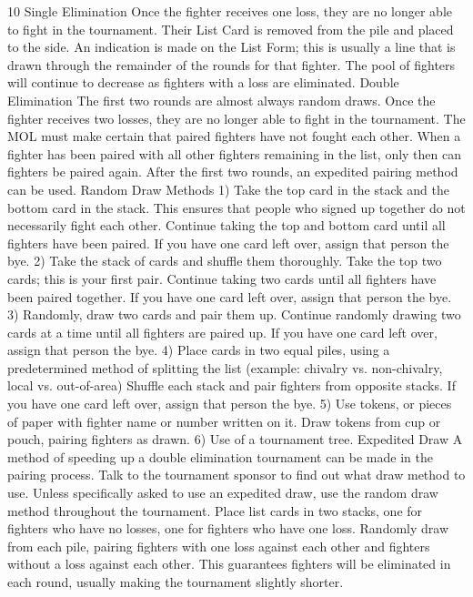 \documentclass{article}
\begin{document}
10
Single Elimination
Once the fighter receives one loss, they are no longer able to fight in the tournament. Their List Card is
removed from the pile and placed to the side. An indication is made on the List Form; this is usually a line
that is drawn through the remainder of the rounds for that fighter. The pool of fighters will continue to
decrease as fighters with a loss are eliminated.
Double Elimination
The first two rounds are almost always random draws. Once the fighter receives two losses, they are no
longer able to fight in the tournament. The MOL must make certain that paired fighters have not fought
each other. When a fighter has been paired with all other fighters remaining in the list, only then can
fighters be paired again. After the first two rounds, an expedited pairing method can be used.
Random Draw Methods
1) Take the top card in the stack and the bottom card in the stack. This ensures that people who signed up
together do not necessarily fight each other. Continue taking the top and bottom card until all fighters
have been paired. If you have one card left over, assign that person the bye.
2) Take the stack of cards and shuffle them thoroughly. Take the top two cards; this is your first pair.
Continue taking two cards until all fighters have been paired together. If you have one card left over,
assign that person the bye.
3) Randomly, draw two cards and pair them up. Continue randomly drawing two cards at a time until all
fighters are paired up. If you have one card left over, assign that person the bye.
4) Place cards in two equal piles, using a predetermined method of splitting the list (example: chivalry vs.
non-chivalry, local vs. out-of-area) Shuffle each stack and pair fighters from opposite stacks. If you
have one card left over, assign that person the bye.
5) Use tokens, or pieces of paper with fighter name or number written on it. Draw tokens from cup or
pouch, pairing fighters as drawn.
6) Use of a tournament tree.
Expedited Draw
A method of speeding up a double elimination tournament can be made in the pairing process. Talk to the
tournament sponsor to find out what draw method to use. Unless specifically asked to use an expedited
draw, use the random draw method throughout the tournament.
Place list cards in two stacks, one for fighters who have no losses, one for fighters who have one loss.
Randomly draw from each pile, pairing fighters with one loss against each other and fighters without a
loss against each other. This guarantees fighters will be eliminated in each round, usually making the
tournament slightly shorter.
\end{document}
